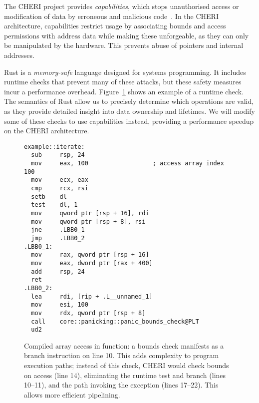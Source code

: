 \documentclass[11pt]{article}
\begin{document}
The CHERI project provides \emph{capabilities}, which stops unauthorised access or modification of data by erroneous and malicious code~\cite{cheri-v6}.
In the CHERI architecture, capabilities restrict usage by associating bounds and access permissions with address data while making these unforgeable, as they can only be manipulated by the hardware.
This prevents abuse of pointers and internal addresses.

Rust is a \emph{memory-safe} language designed for systems programming.
It includes runtime checks that prevent many of these attacks, but these safety measures incur a performance overhead.
Figure~\ref{lst:array-check} shows an example of a runtime check.
The semantics of Rust allow us to precisely determine which operations are valid, as they provide detailed insight into data ownership and lifetimes.
We will modify some of these checks to use capabilities instead, providing a performance speedup on the CHERI architecture.

\begin{figure}[ht]
\begin{lstlisting}
example::iterate:
  sub     rsp, 24
  mov     eax, 100                  ; access array index 100
  mov     ecx, eax
  cmp     rcx, rsi
  setb    dl
  test    dl, 1
  mov     qword ptr [rsp + 16], rdi
  mov     qword ptr [rsp + 8], rsi
  jne     .LBB0_1
  jmp     .LBB0_2
.LBB0_1:
  mov     rax, qword ptr [rsp + 16]
  mov     eax, dword ptr [rax + 400]
  add     rsp, 24
  ret
.LBB0_2:
  lea     rdi, [rip + .L__unnamed_1]
  mov     esi, 100
  mov     rdx, qword ptr [rsp + 8]
  call    core::panicking::panic_bounds_check@PLT
  ud2
\end{lstlisting}
\caption{Compiled array access in function: a bounds check manifests as a branch instruction on line 10. This adds complexity to program execution paths; instead of this check, CHERI would check bounds on access (line 14), eliminating the runtime test and branch (lines 10--11), and the path invoking the exception (lines 17--22). This allows more efficient pipelining.}
\label{lst:array-check}
\end{figure}
\end{document}
